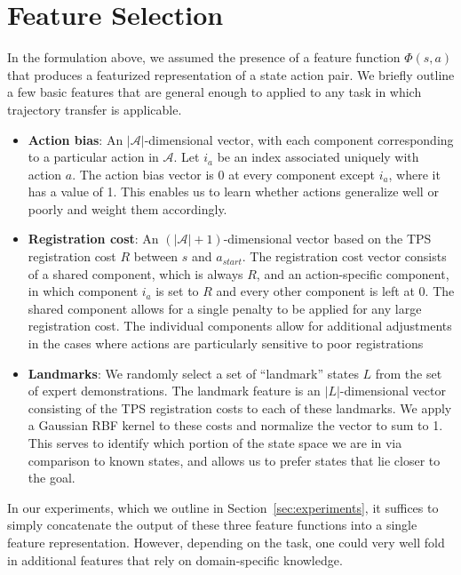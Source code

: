 \section{Feature Selection}
\label{sec:features}

In the formulation above, we assumed the presence of a feature function
$\Phi(s,a)$ that produces a featurized representation of a state action pair.
We briefly outline a few basic features that are general enough to applied to
any task in which trajectory transfer is applicable. 

\begin{itemize}
  \item \textbf{Action bias}: An $|\mathcal{A}|$-dimensional vector, with each
    component corresponding to a particular action in $\mathcal{A}$. Let $i_a$
    be an index associated uniquely with action $a$. The action bias vector is 0
    at every component except $i_a$, where it has a value of 1. This enables us
    to learn whether actions generalize well or poorly and weight them
    accordingly.
  \item \textbf{Registration cost}: An $(|\mathcal{A}|+1)$-dimensional vector
    based on the TPS registration cost $R$ between $s$ and $a_{start}$. The
    registration cost vector consists of a shared component, which is always
    $R$, and an action-specific component, in which component $i_a$ is set to
    $R$ and every other component is left at 0. The shared component allows for
    a single penalty to be applied for any large registration cost. The
    individual components allow for additional adjustments in the cases where
    actions are particularly sensitive to poor registrations
  \item \textbf{Landmarks}: We randomly select a set of ``landmark'' states $L$
    from the set of expert demonstrations. The landmark feature is an
    $|L|$-dimensional vector consisting of the TPS registration costs to each of
    these landmarks. We apply a Gaussian RBF kernel to these costs and normalize
    the vector to sum to 1. This serves to identify which portion of the state
    space we are in via comparison to known states, and allows us to prefer
    states that lie closer to the goal.
\end{itemize}

In our experiments, which we outline in Section~\ref{sec:experiments}, it
suffices to simply concatenate the output of these three feature functions into
a single feature representation. However, depending on the task, one could
very well fold in additional features that rely on domain-specific knowledge.
